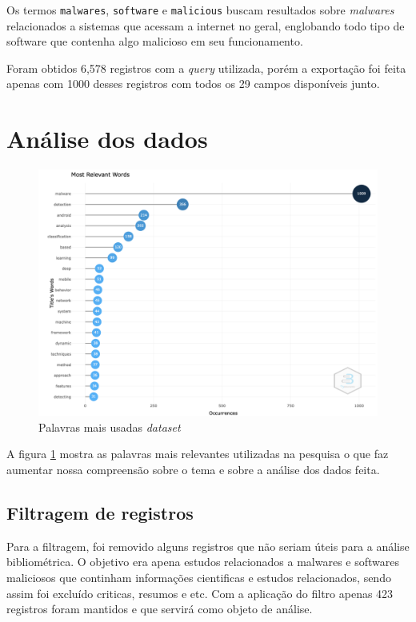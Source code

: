 Os termos \texttt{malwares}, \texttt{software} e \texttt{malicious} buscam resultados sobre \textit{malwares} relacionados a sistemas que acessam a internet no geral, englobando todo tipo de software que contenha algo malicioso em seu funcionamento.

Foram obtidos 6,578 registros com a \textit{query} utilizada, porém a exportação foi feita apenas com 1000 desses registros com todos os 29 campos disponíveis junto.

\section{Análise dos dados}

\begin{figure}
    \centering
    \includegraphics[width=1\textwidth]{experiments/gsmartins96/AnaliseBibliometrica/Malware/Figs/most-relevant_words.png}
    \caption{Palavras mais usadas \textit{dataset}}
    \label{fig:MALWARES@gsmartins96:MostUsedWords}
\end{figure}

A figura \ref{fig:MALWARES@gsmartins96:MostUsedWords} mostra as palavras mais relevantes utilizadas na pesquisa o que faz aumentar nossa compreensão sobre o tema e sobre a análise dos dados feita.

\subsection{Filtragem de registros}

Para a filtragem, foi removido alguns registros que não seriam úteis para a análise bibliométrica. O objetivo era apena estudos relacionados a malwares e softwares maliciosos que continham informações cientificas e estudos relacionados, sendo assim foi excluído criticas, resumos e etc. Com a aplicação do filtro apenas 423 registros foram mantidos e que servirá como objeto de análise.

